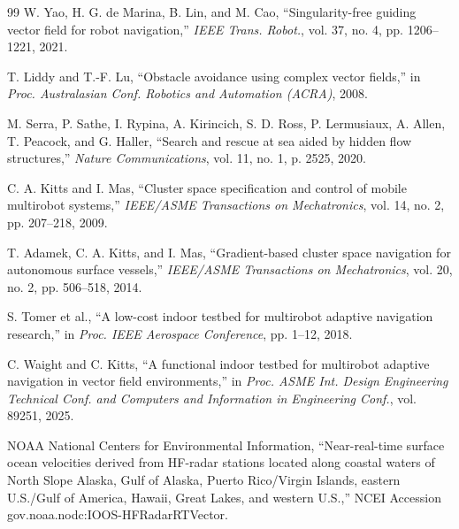 \documentclass[lettersize,journal]{IEEEtran}
\begin{document}
\begin{thebibliography}{99}
 W. Yao, H. G. de Marina, B. Lin, and M. Cao,
``Singularity-free guiding vector field for robot navigation,''
\textit{IEEE Trans. Robot.}, vol. 37, no. 4, pp. 1206--1221, 2021.

 T. Liddy and T.-F. Lu, ``Obstacle avoidance using complex
vector fields,'' in \textit{Proc. Australasian Conf. Robotics and
Automation (ACRA)}, 2008.

 M. Serra, P. Sathe, I. Rypina, A. Kirincich, S. D. Ross,
P. Lermusiaux, A. Allen, T. Peacock, and G. Haller, ``Search and rescue
at sea aided by hidden flow structures,'' \textit{Nature Communications},
vol. 11, no. 1, p. 2525, 2020.

 C. A. Kitts and I. Mas, ``Cluster space specification and control
of mobile multirobot systems,'' \textit{IEEE/ASME Transactions on Mechatronics},
vol. 14, no. 2, pp. 207--218, 2009.

 T. Adamek, C. A. Kitts, and I. Mas, ``Gradient-based cluster space
navigation for autonomous surface vessels,'' \textit{IEEE/ASME Transactions on
Mechatronics}, vol. 20, no. 2, pp. 506--518, 2014.

 S. Tomer et al., ``A low-cost indoor testbed for multirobot
adaptive navigation research,'' in \textit{Proc. IEEE Aerospace Conference},
pp. 1--12, 2018.

 C. Waight and C. Kitts, ``A functional indoor testbed for
multirobot adaptive navigation in vector field environments,'' in
\textit{Proc. ASME Int. Design Engineering Technical Conf. and Computers
and Information in Engineering Conf.}, vol. 89251, 2025.

 NOAA National Centers for Environmental Information,
``Near-real-time surface ocean velocities derived from HF-radar stations
located along coastal waters of North Slope Alaska, Gulf of Alaska,
Puerto Rico/Virgin Islands, eastern U.S./Gulf of America, Hawaii, Great
Lakes, and western U.S.,'' NCEI Accession
gov.noaa.nodc:IOOS-HFRadarRTVector.

\end{thebibliography}
\end{document}
